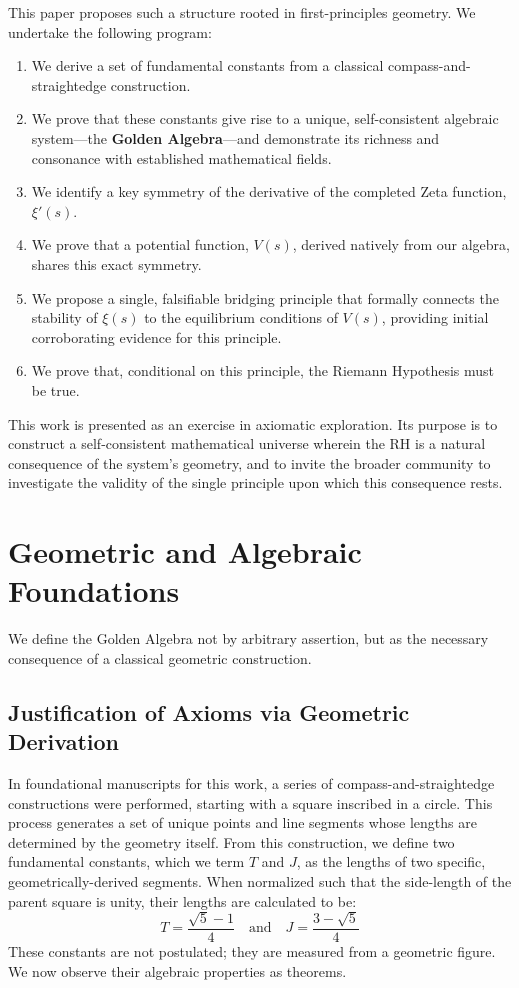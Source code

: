 \documentclass{article}
\theoremstyle{plain}
\theoremstyle{definition}
\theoremstyle{remark}
\begin{document}
This paper proposes such a structure rooted in first-principles geometry. We undertake the following program:
\begin{enumerate}
    \item We derive a set of fundamental constants from a classical compass-and-straightedge construction.
    \item We prove that these constants give rise to a unique, self-consistent algebraic system—the \textbf{Golden Algebra}—and demonstrate its richness and consonance with established mathematical fields.
    \item We identify a key symmetry of the derivative of the completed Zeta function, $\xi'(s)$.
    \item We prove that a potential function, $V(s)$, derived natively from our algebra, shares this exact symmetry.
    \item We propose a single, falsifiable bridging principle that formally connects the stability of $\xi(s)$ to the equilibrium conditions of $V(s)$, providing initial corroborating evidence for this principle.
    \item We prove that, conditional on this principle, the Riemann Hypothesis must be true.
\end{enumerate}
This work is presented as an exercise in axiomatic exploration. Its purpose is to construct a self-consistent mathematical universe wherein the RH is a natural consequence of the system's geometry, and to invite the broader community to investigate the validity of the single principle upon which this consequence rests.

\section{Geometric and Algebraic Foundations}
We define the Golden Algebra not by arbitrary assertion, but as the necessary consequence of a classical geometric construction.

\subsection{Justification of Axioms via Geometric Derivation}
In foundational manuscripts for this work, a series of compass-and-straightedge constructions were performed, starting with a square inscribed in a circle. This process generates a set of unique points and line segments whose lengths are determined by the geometry itself. From this construction, we define two fundamental constants, which we term $T$ and $J$, as the lengths of two specific, geometrically-derived segments. When normalized such that the side-length of the parent square is unity, their lengths are calculated to be:
$$ T = \frac{\sqrt{5}-1}{4} \quad \text{and} \quad J = \frac{3-\sqrt{5}}{4} $$
These constants are not postulated; they are measured from a geometric figure. We now observe their algebraic properties as theorems.
\end{document}
